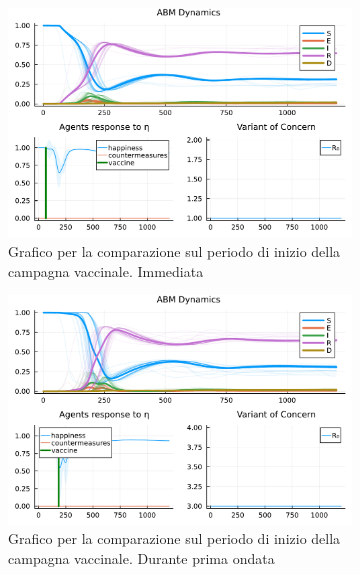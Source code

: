 \begin{figure}[!hb]
	\centering
	\begin{subfigure}[b]{0.45\textwidth}
		\centering
		\includegraphics[width=\textwidth]{img/SocialNetworkABM_1_V.pdf}
		\caption{Grafico per la comparazione sul periodo di inizio della campagna vaccinale. Immediata}
		\label{fig:comparison_vax_1}
	\end{subfigure}
	\hfill
	\begin{subfigure}[b]{0.45\textwidth}
		\centering
		\includegraphics[width=\textwidth]{img/SocialNetworkABM_3_V.pdf}
		\caption{Grafico per la comparazione sul periodo di inizio della campagna vaccinale. Durante prima ondata}
		\label{fig:comparison_vax_2}
	\end{subfigure}
	\hfill
	\begin{subfigure}[b]{0.45\textwidth}
		\centering

\end{subfigure}
\end{figure}
